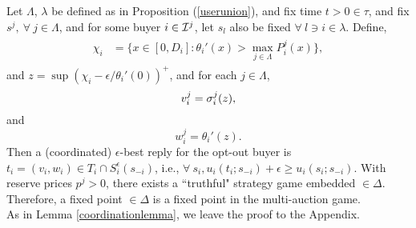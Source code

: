 {
\label{incentive}
Let $\Lambda$, $\lambda$ be defined as in Proposition (\ref{userunion}), and fix time
$t>0 \in \tau$, and fix $s^j, \ \forall \ j\in\Lambda$, and for some
buyer $i\in \mathcal{I}^j$, let $s_l$ also be fixed $\forall \ l\ni i \in \lambda$. Define,
\begin{align}
\begin{split}\label{eta}
    \chi_i &= \bigg\lbrace x\in [0,D_i] : 
 {\theta_i}'(x) > \max_{j\in\Lambda}P_i^j(x)\bigg\rbrace, 
\end{split}
\end{align}
and $z = \sup(\chi_i - \epsilon / \theta_i'(0))^+$, and for each $j \in
\Lambda$, 
$$
    v_i^j = \sigma_i^{j}(z),
$$
and 
$$
    w_i^j = \theta_i'(z).%
$$
Then a (coordinated) $\epsilon$-best reply for the opt-out buyer is $t_i =
(v_i,w_i) \in T_i\cap S_i^\epsilon(s_{-i})$, i.e., $\forall \ s_i, u_i(t_i;s_{-i}) + \epsilon \ge u_i(s_i;
s_{-i})$.
With reserve prices $p^j >0$, there exists a ``truthful" strategy game embedded
$\in\Delta$. Therefore, a fixed point $\in \Delta$ is a fixed point in
the multi-auction game. 
}\\
As in Lemma \ref{coordinationlemma}, we leave the proof to the Appendix.


